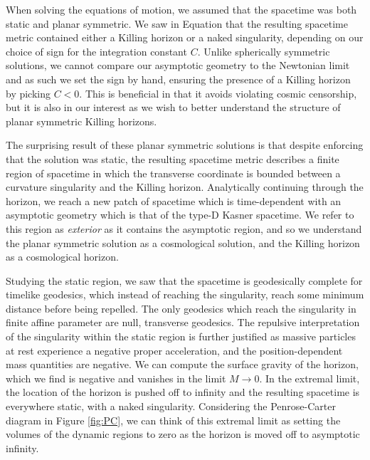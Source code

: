 When solving the equations of motion, we assumed that the spacetime was both static and planar symmetric. We saw in Equation  that the resulting spacetime metric contained either a Killing horizon or a naked singularity, depending on our choice of sign for the integration constant $C$. Unlike spherically symmetric solutions, we cannot compare our asymptotic geometry to the Newtonian limit and as such we set the sign by hand, ensuring the presence of a Killing horizon by picking $C < 0$. This is beneficial in that it avoids violating cosmic censorship, but it is also in our interest as we wish to better understand the structure of planar symmetric Killing horizons.

The surprising result of these planar symmetric solutions is that despite enforcing that the solution was static, the resulting spacetime metric describes a finite region of spacetime in which the transverse coordinate is bounded between a curvature singularity and the Killing horizon. Analytically continuing through the horizon, we reach a new patch of spacetime which is time-dependent with an asymptotic geometry which is that of the type-D Kasner spacetime. We refer to this region as \emph{exterior} as it contains the asymptotic region, and so we understand the planar symmetric solution as a cosmological solution, and the Killing horizon as a cosmological horizon.

Studying the static region, we saw that the spacetime is geodesically complete for timelike geodesics, which instead of reaching the singularity, reach some minimum distance before being repelled. The only geodesics which reach the singularity in finite affine parameter are null, transverse geodesics. The repulsive interpretation of the singularity within the static region is further justified as massive particles at rest experience a negative proper acceleration, and the position-dependent mass quantities are negative. We can compute the surface gravity of the horizon, which we find is negative and vanishes in the limit $M \to 0$. In the extremal limit, the location of the horizon is pushed off to infinity and the resulting spacetime is everywhere static, with a naked singularity. Considering the Penrose-Carter diagram in Figure \ref{fig:PC}, we can think of this extremal limit as setting the volumes of the dynamic regions to zero as the horizon is moved off to asymptotic infinity. 

